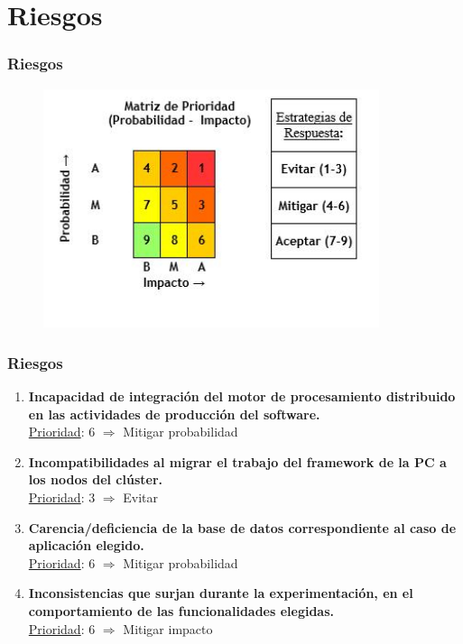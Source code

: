 \section{Riesgos}
\watermarkoff
\begin{frame}[t,fragile]
	\frametitle {Riesgos}
	\begin{figure}
		\includegraphics[height=7cm]{imagenes/prioridad.jpg}
	\end{figure}
\end{frame}
\watermarkon
\begin{frame}[t,fragile]
	\frametitle {Riesgos}
	\begin{enumerate}[R001]
		\item \textbf{Incapacidad de integraci\'on del motor de procesamiento distribuido en las actividades de producci\'on del software.}\\
		\underline{Prioridad}: 6 $\Rightarrow$ \colorbox{yellow!50!orange}{Mitigar probabilidad}
		\pause
		\item \textbf{Incompatibilidades al migrar el trabajo del framework de la PC a los nodos del cl\'uster.}\\
		\underline{Prioridad}: 3 $\Rightarrow$ \colorbox{orange!100}{Evitar}
		\pause
		\item \textbf{Carencia/deficiencia de la base de datos correspondiente al caso de aplicaci\'on elegido.}\\
		\underline{Prioridad}: 6 $\Rightarrow$ \colorbox{yellow!50!orange}{Mitigar probabilidad}
		\pause
		\item \textbf{Inconsistencias que surjan durante la experimentaci\'on, en el comportamiento de las funcionalidades elegidas.}\\
		\underline{Prioridad}: 6 $\Rightarrow$ \colorbox{yellow!50!orange}{Mitigar impacto}			
	\end{enumerate}
\end{frame}


